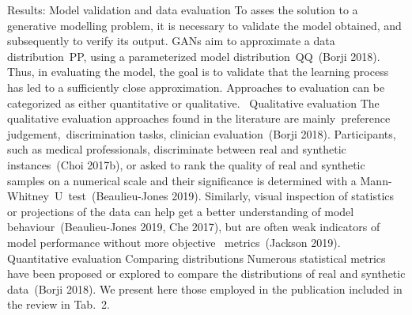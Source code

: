 Results: Model validation and data evaluation
To asses the solution to a generative modelling problem, it is necessary to validate the model obtained, and subsequently to verify its output. GANs aim to approximate a data distribution PP​, using a parameterized model distribution QQ​ (Borji 2018). Thus, in evaluating the model, the goal is to validate that the learning process has led to a sufficiently close approximation. Approaches to evaluation can be categorized as either quantitative or qualitative. 
Qualitative evaluation
The qualitative evaluation approaches found in the literature are mainly preference judgement, discrimination tasks, clinician evaluation (Borji 2018). Participants, such as medical professionals, discriminate between real and synthetic instances (Choi 2017b), or asked to rank the quality of real and synthetic samples on a numerical scale and their significance is determined with a Mann-Whitney U test (Beaulieu-Jones 2019). Similarly, visual inspection of statistics or projections of the data can help get a better understanding of model behaviour (Beaulieu-Jones 2019, Che 2017), but are often weak indicators of model performance without more objective  metrics (Jackson 2019). 
Quantitative evaluation
Comparing distributions
Numerous statistical metrics have been proposed or explored to compare the distributions of real and synthetic data (Borji 2018). We present here those employed in the publication included in the review in Tab. 2.

